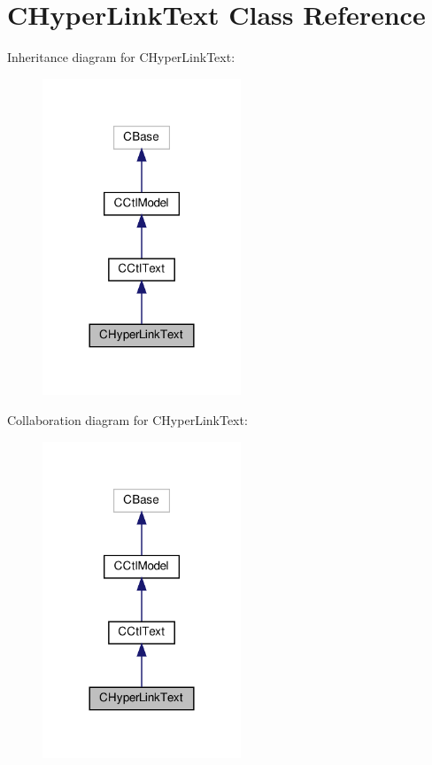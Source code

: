 \hypertarget{classCHyperLinkText}{}\section{C\+Hyper\+Link\+Text Class Reference}
\label{classCHyperLinkText}


Inheritance diagram for C\+Hyper\+Link\+Text\+:
\nopagebreak
\begin{figure}[H]
\begin{center}
\leavevmode
\includegraphics[width=168pt]{classCHyperLinkText__inherit__graph}
\end{center}
\end{figure}


Collaboration diagram for C\+Hyper\+Link\+Text\+:
\nopagebreak
\begin{figure}[H]
\begin{center}
\leavevmode
\includegraphics[width=168pt]{classCHyperLinkText__coll__graph}
\end{center}
\end{figure}
